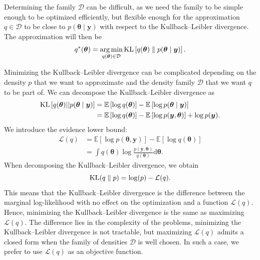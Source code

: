 \documentclass[a4paper, 11pt]{report}
\numberwithin{equation}{section}
\DeclareMathOperator*{\argmin}{arg\,min}
\DeclareMathOperator*{\KL}{{\rm KL}}
\begin{document}
Determining the family $\mathcal{D}$ can be difficult, as we need the family to be simple enough to be optimized efficiently, but flexible enough for the approximation $q \in \mathcal{D}$ to be close to $p(\boldsymbol{\theta} \mid \boldsymbol{y})$ with respect to the Kullback--Leibler divergence. The approximation will then be
\begin{equation*}
q^*(\boldsymbol{\theta} ) = \argmin_{q(\boldsymbol{\theta}) \in \mathcal{D}} \KL\left[ q(\boldsymbol{\theta}) \parallel p(\boldsymbol{\theta} \mid \boldsymbol{y})\right].
\end{equation*}

Minimizing the Kullback--Leibler divergence can be complicated depending on the density $p$ that we want to approximate and the density family $\mathcal{D}$ that we want $q$ to be part of. We can decompose the Kullback--Leibler divergence as
\begin{align*}
\KL\left[q(\boldsymbol{\theta})||p(\boldsymbol{\theta}\mid \boldsymbol{y})\right] &= \mathbb{E}\left[\log q(\boldsymbol{\theta})\right] - \mathbb{E}\left[\log p(\boldsymbol{\theta}\mid \boldsymbol{y})\right]\\
&= \mathbb{E}\left[\log q(\boldsymbol{\theta})\right] - \mathbb{E}\left[\log p(\boldsymbol{y},\boldsymbol{\theta})\right] + \log p(\boldsymbol{y}).
\end{align*}
We introduce the evidence lower bound:
\begin{align*}
\mathcal{L}(q) &= \mathbb{E}\left[\log p(\boldsymbol{\theta},\boldsymbol{y})\right] - \mathbb{E}\left[\log q(\boldsymbol{\theta})\right]\\
&=\int q(\boldsymbol{\theta})\log\frac{p(\boldsymbol{y},\boldsymbol{\theta})}{q(\boldsymbol{\theta})}\mathrm{d}\boldsymbol{\theta}.
\end{align*}
When decomposing the Kullback--Leibler divergence, we obtain
\begin{equation*}
\KL(q\parallel p) = \log(p) - \mathcal{L}(q).
\end{equation*}
This means that the Kullback--Leibler divergence is the difference between the marginal log-likelihood with no effect on the optimization and a function $\mathcal{L}(q)$. Hence, minimizing the Kullback--Leibler divergence is the same as maximizing $\mathcal{L}(q)$. The difference lies in the complexity of the problems, minimizing the Kullback--Leibler divergence is not tractable, but maximizing $\mathcal{L}(q)$ admits a closed form when the family of densities $\mathcal{D}$ is well chosen. In such a case, we prefer to use $\mathcal{L}(q)$ as an objective function.
\end{document}
